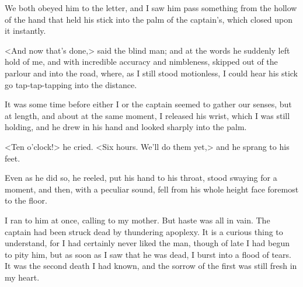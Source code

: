 We both obeyed him to the letter, and I saw him pass something from the hollow of the hand that held his stick into the palm of the captain's, which closed upon it instantly.

<And now that's done,> said the blind man; and at the words he suddenly left hold of me, and with incredible accuracy and nimbleness, skipped out of the parlour and into the road, where, as I still stood motionless, I could hear his stick go tap-tap-tapping into the distance.

It was some time before either I or the captain seemed to gather our senses, but at length, and about at the same moment, I released his wrist, which I was still holding, and he drew in his hand and looked sharply into the palm.

<Ten o'clock!> he cried. <Six hours. We'll do them yet,> and he sprang to his feet.

Even as he did so, he reeled, put his hand to his throat, stood swaying for a moment, and then, with a peculiar sound, fell from his whole height face foremost to the floor.

I ran to him at once, calling to my mother. But haste was all in vain. The captain had been struck dead by thundering apoplexy. It is a curious thing to understand, for I had certainly never liked the man, though of late I had begun to pity him, but as soon as I saw that he was dead, I burst into a flood of tears. It was the second death I had known, and the sorrow of the first was still fresh in my heart.